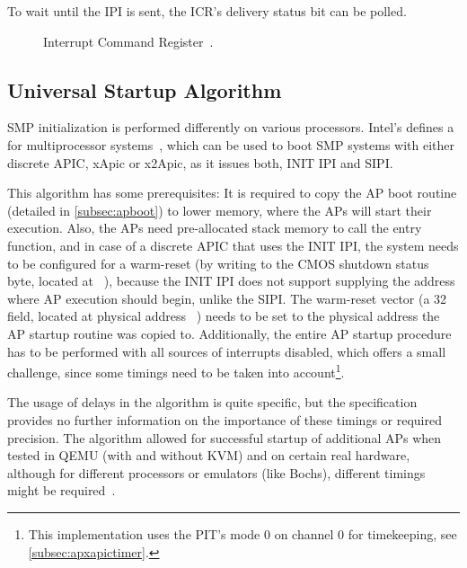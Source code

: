 To wait until the IPI is sent, the ICR's delivery status bit can be polled.

\begin{figure}[h]
  \centering
  \begin{subfigure}[b]{0.7\textwidth}
    
  \end{subfigure}
  \caption{Interrupt Command Register~\autocite[sec.~3.11.6.1]{ia32}.}
  \label{fig:ia32icr}
\end{figure}

\subsection{Universal Startup Algorithm}
\label{subsec:apstartup}

SMP initialization is performed differently on various processors.
Intel's  defines a  for multiprocessor systems~\autocite[sec.~B.4]{mpspec}, which can be used to boot SMP systems with either discrete APIC, xApic or x2Apic, as it issues both, INIT IPI and SIPI\@.

This algorithm has some prerequisites: It is required to copy the AP boot routine (detailed in \autoref{subsec:apboot}) to lower memory, where the APs will start their execution.
Also, the APs need pre-allocated stack memory to call the entry function, and in case of a discrete APIC that uses the INIT IPI, the system needs to be configured for a warm-reset (by writing  to the CMOS shutdown status byte, located at ~\autocite[sec.~B.4]{mpspec}), because the INIT IPI does not support supplying the address where AP execution should begin, unlike the SIPI\@.
The warm-reset vector (a \SI{32}{\bit} field, located at physical address ~\autocite[sec.~B.4]{mpspec}) needs to be set to the physical address the AP startup routine was copied to.
Additionally, the entire AP startup procedure has to be performed with all sources of interrupts disabled, which offers a small challenge, since some timings need to be taken into account\footnote{
  This implementation uses the PIT's mode 0 on channel 0 for timekeeping, see \autoref{subsec:apxapictimer}.}.

The usage of delays in the algorithm is quite specific, but the specification provides no further information on the importance of these timings or required precision.
The algorithm allowed for successful startup of additional APs when tested in QEMU (with and without KVM) and on certain real hardware, although for different processors or emulators (like Bochs), different timings might be required~\autocite[lapic.c]{xv6}.

